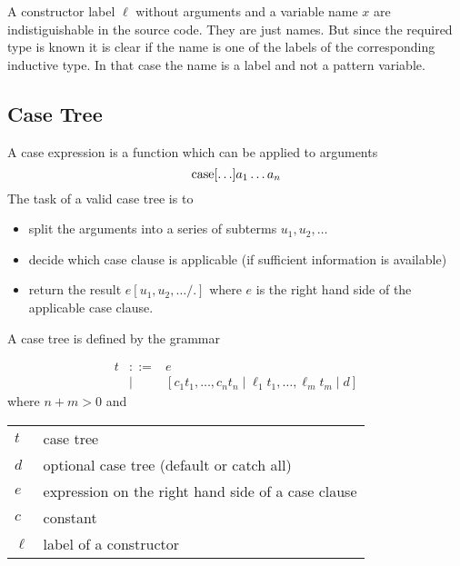 A constructor label $\ell$ without arguments and a variable name $x$ are
indistiguishable in the source code. They are just names. But since the required
type is known it is clear if the name is one of the labels of the corresponding
inductive type. In that case the name is a label and not a pattern variable.






\subsection{Case Tree}

A case expression is a function which can be applied to arguments
$$
    {\text{case}}[\ldots] a_1 \ldots a_n
$$
%
The task of a valid case tree is to
\begin{itemize}
    \item split the arguments into a series of subterms $u_1,u_2, \ldots$

    \item decide which case clause is applicable (if sufficient information is
        available)

    \item return the result $e[u_1, u_2, \ldots / .]$ where $e$ is the right
        hand side of the applicable case clause.
\end{itemize}

A case tree is defined by the grammar

$$
    \begin{array}{lllll}
        t
        &::=& e
        \\
        &\mid& [
            c_1 t_1, \ldots,  c_n t_n \mid
            \ell_1 t_1, \ldots, \ell_m t_m
            \mid
            d
        ]
    \end{array}
$$
%
where $n + m > 0$ and
%
\begin{center}
    \begin{tabular}{l p{8cm}}
        $t$ & case tree
        \\
        $d$ & optional case tree (default or catch all)
        \\
        $e$ & expression on the right hand side of a case clause
        \\
        $c$ & constant
        \\
        $\ell$ & label of a constructor
    \end{tabular}
\end{center}

